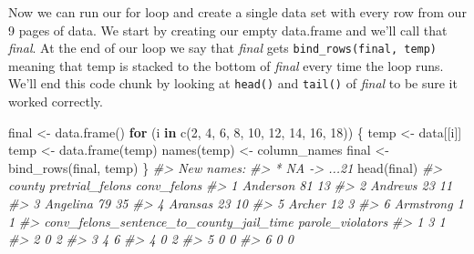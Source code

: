 \documentclass[
]{krantz}
\makeatletter
\newenvironment{Shaded}{\begin{snugshade}}{\end{snugshade}}
\newcommand{\CommentTok}[1]{\textcolor[rgb]{0.37,0.37,0.37}{\textit{#1}}}
\newcommand{\ControlFlowTok}[1]{\textcolor[rgb]{0.27,0.27,0.27}{\textbf{#1}}}
\newcommand{\DecValTok}[1]{\textcolor[rgb]{0.06,0.06,0.06}{#1}}
\newcommand{\FunctionTok}[1]{\textcolor[rgb]{0,0,0}{#1}}
\newcommand{\NormalTok}[1]{#1}
\newcommand{\OtherTok}[1]{\textcolor[rgb]{0.37,0.37,0.37}{#1}}
\newenvironment{kframe}{%
\medskip{}
\setlength{\fboxsep}{.8em}
 \def\at@end@of@kframe{}%
 \ifinner\ifhmode%
  \def\at@end@of@kframe{\end{minipage}}%
  \begin{minipage}{\columnwidth}%
 \fi\fi%
 \def\FrameCommand##1{\hskip\@totalleftmargin \hskip-\fboxsep
 \colorbox{shadecolor}{##1}\hskip-\fboxsep
     \hskip-\linewidth \hskip-\@totalleftmargin \hskip\columnwidth}%
 \MakeFramed {\advance\hsize-\width
   \@totalleftmargin\z@ \linewidth\hsize
   \@setminipage}}%
 {\par\unskip\endMakeFramed%
 \at@end@of@kframe}
\renewenvironment{Shaded}{\begin{kframe}}{\end{kframe}}
\makeatother
\begin{document}
Now we can run our for loop and create a single data set
with every row from our 9 pages of data. We start by
creating our empty data.frame and we'll call that
\emph{final}. At the end of our loop we say that
\emph{final} gets \texttt{bind\_rows(final,\ temp)} meaning
that temp is stacked to the bottom of \emph{final} every
time the loop runs. We'll end this code chunk by looking at
\texttt{head()} and \texttt{tail()} of \emph{final} to be
sure it worked correctly.

\begin{Shaded}
\begin{Highlighting}[]
\NormalTok{final }\OtherTok{\textless{}{-}} \FunctionTok{data.frame}\NormalTok{()}
\ControlFlowTok{for}\NormalTok{ (i }\ControlFlowTok{in} \FunctionTok{c}\NormalTok{(}\DecValTok{2}\NormalTok{, }\DecValTok{4}\NormalTok{, }\DecValTok{6}\NormalTok{, }\DecValTok{8}\NormalTok{, }\DecValTok{10}\NormalTok{, }\DecValTok{12}\NormalTok{, }\DecValTok{14}\NormalTok{, }\DecValTok{16}\NormalTok{, }\DecValTok{18}\NormalTok{)) \{}
\NormalTok{  temp }\OtherTok{\textless{}{-}}\NormalTok{ data[[i]]}
\NormalTok{  temp }\OtherTok{\textless{}{-}} \FunctionTok{data.frame}\NormalTok{(temp)}
  \FunctionTok{names}\NormalTok{(temp) }\OtherTok{\textless{}{-}}\NormalTok{ column\_names}
\NormalTok{  final }\OtherTok{\textless{}{-}} \FunctionTok{bind\_rows}\NormalTok{(final, temp)}
\NormalTok{\}}
\CommentTok{\#\textgreater{} New names:}
\CommentTok{\#\textgreater{} * NA {-}\textgreater{} ...21}
\FunctionTok{head}\NormalTok{(final)}
\CommentTok{\#\textgreater{}      county pretrial\_felons conv\_felons}
\CommentTok{\#\textgreater{} 1  Anderson              81          13}
\CommentTok{\#\textgreater{} 2   Andrews              23          11}
\CommentTok{\#\textgreater{} 3  Angelina              79          35}
\CommentTok{\#\textgreater{} 4   Aransas              23          10}
\CommentTok{\#\textgreater{} 5    Archer              12           3}
\CommentTok{\#\textgreater{} 6 Armstrong               1           1}
\CommentTok{\#\textgreater{}   conv\_felons\_sentence\_to\_county\_jail\_time parole\_violators}
\CommentTok{\#\textgreater{} 1                                        3                1}
\CommentTok{\#\textgreater{} 2                                        0                2}
\CommentTok{\#\textgreater{} 3                                        4                6}
\CommentTok{\#\textgreater{} 4                                        0                2}
\CommentTok{\#\textgreater{} 5                                        0                0}
\CommentTok{\#\textgreater{} 6                                        0                0}

\end{Highlighting}
\end{Shaded}
\end{document}
